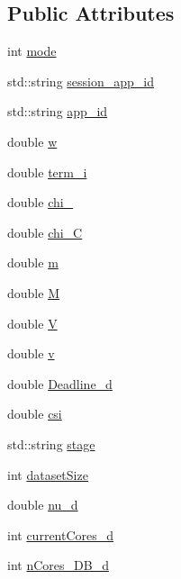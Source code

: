 \subsection*{Public Attributes}
\begin{DoxyCompactItemize}
\item 
int \hyperlink{classApplication_abc7e87e8cbe2e64fa4e2ff2afdf7a4fc}{mode}
\item 
std\-::string \hyperlink{classApplication_a5e28ffadb86925ecae57ab18c0085d90}{session\-\_\-app\-\_\-id}
\item 
std\-::string \hyperlink{classApplication_a05377e6cdcb9d48f29e0f1972a4a16fe}{app\-\_\-id}
\item 
double \hyperlink{classApplication_aead1b7b0150c2a3ebd6c36b1db8c4732}{w}
\item 
double \hyperlink{classApplication_ad5486702327ad61e56ed04fb54d58c20}{term\-\_\-i}
\item 
double \hyperlink{classApplication_a3b9dab40d189989c836b8d328946bbb6}{chi\-\_}
\item 
double \hyperlink{classApplication_a46e29a6bfc74de610feec809a77dfb62}{chi\-\_\-\-C}
\item 
double \hyperlink{classApplication_ab903d83d3cde51569a27f97752c9f158}{m}
\item 
double \hyperlink{classApplication_a14904a2abf46cc0a50eb82043fa0912e}{M}
\item 
double \hyperlink{classApplication_aa92ad37e6701931176e0dc9b260fd7ee}{V}
\item 
double \hyperlink{classApplication_a9efc167094a42382504dd28a7ac402e0}{v}
\item 
double \hyperlink{classApplication_a2a989ae288a74ee5250b5acf449c864a}{Deadline\-\_\-d}
\item 
double \hyperlink{classApplication_a20adc533c6b6147342b3f60dc0fbd9bc}{csi}
\item 
std\-::string \hyperlink{classApplication_adb1cba2c06695bfdf81482dfba449d5b}{stage}
\item 
int \hyperlink{classApplication_aaa155e818d807f585d83ecacf4abfe42}{dataset\-Size}
\item 
double \hyperlink{classApplication_a42c22b9a3130cf1f2722ce222f2e5bae}{nu\-\_\-d}
\item 
int \hyperlink{classApplication_adee341a84a5389dfd4d16e7f8e697190}{current\-Cores\-\_\-d}
\item 
int \hyperlink{classApplication_a95104d330c9c7ed2c1017b4938a39a9a}{n\-Cores\-\_\-\-D\-B\-\_\-d}
\item 

\end{DoxyCompactItemize}

